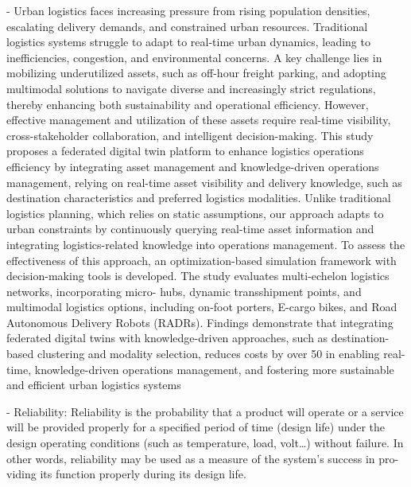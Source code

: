 \cite{yu2025federated} - Urban logistics faces increasing pressure from rising population densities, escalating delivery demands, and
constrained urban resources. Traditional logistics systems struggle to adapt to real-time urban dynamics, leading
to inefficiencies, congestion, and environmental concerns. A key challenge lies in mobilizing underutilized assets,
such as off-hour freight parking, and adopting multimodal solutions to navigate diverse and increasingly strict
regulations, thereby enhancing both sustainability and operational efficiency. However, effective management
and utilization of these assets require real-time visibility, cross-stakeholder collaboration, and intelligent
decision-making. This study proposes a federated digital twin platform to enhance logistics operations efficiency
by integrating asset management and knowledge-driven operations management, relying on real-time asset
visibility and delivery knowledge, such as destination characteristics and preferred logistics modalities. Unlike
traditional logistics planning, which relies on static assumptions, our approach adapts to urban constraints by
continuously querying real-time asset information and integrating logistics-related knowledge into operations
management. To assess the effectiveness of this approach, an optimization-based simulation framework with
decision-making tools is developed. The study evaluates multi-echelon logistics networks, incorporating micro-
hubs, dynamic transshipment points, and multimodal logistics options, including on-foot porters, E-cargo bikes,
and Road Autonomous Delivery Robots (RADRs). Findings demonstrate that integrating federated digital twins
with knowledge-driven approaches, such as destination-based clustering and modality selection, reduces costs by
over 50 %
in enabling real-time, knowledge-driven operations management, and fostering more sustainable and efficient
urban logistics systems




\cite{alma991032896202207371} - Reliability: Reliability is the probability that a product will operate or a service will be
provided properly for a specified period of time (design life) under the design operating
conditions (such as temperature, load, volt…) without failure.
In other words, reliability may be used as a measure of the system’s success in pro-
viding its function properly during its design life. 


